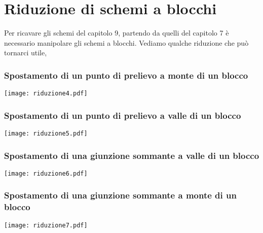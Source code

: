 \newpage
\section{Riduzione di schemi a blocchi}
Per ricavare gli schemi del capitolo 9, partendo da quelli del capitolo 7 è necessario manipolare gli schemi a blocchi. Vediamo qualche riduzione che può tornarci utile,
\subsubsection{Spostamento di un punto di prelievo a monte di un blocco}
\begin{center}
	\texttt{[image: riduzione4.pdf]}
\end{center}

\subsubsection{Spostamento di un punto di prelievo a valle di un blocco}
\begin{center}
	\texttt{[image: riduzione5.pdf]}
\end{center}

\subsubsection{Spostamento di una giunzione sommante a valle di un blocco}
\begin{center}
	\texttt{[image: riduzione6.pdf]}
\end{center}

\subsubsection{Spostamento di una giunzione sommante a monte di un blocco}
\begin{center}
	\texttt{[image: riduzione7.pdf]}
\end{center}